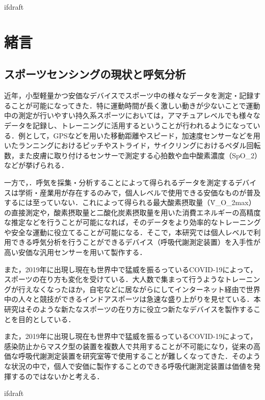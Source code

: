 \expandafter\ifx\csname ifdraft\endcsname\relax
 
\fi

\section{緒言}

\subsection{スポーツセンシングの現状と呼気分析}

近年，小型軽量かつ安価なデバイスでスポーツ中の様々なデータを測定・記録することが可能になってきた．特に運動時間が長く激しい動きが少ないことで運動中の測定が行いやすい持久系スポーツにおいては，アマチュアレベルでも様々なデータを記録し、トレーニングに活用するということが行われるようになっている．例として，GPSなどを用いた移動距離やスピード，加速度センサーなどを用いたランニングにおけるピッチやストライド，サイクリングにおけるペダル回転数，また皮膚に取り付けるセンサーで測定する心拍数や血中酸素濃度（SpO_2）などが挙げられる．

一方で，．呼気を採集・分析することによって得られるデータを測定するデバイスは学術・産業用が存在するのみで，個人レベルで使用できる安価なものが普及するには至っていない．これによって得られる最大酸素摂取量（\.{V}_{O_2max}）の直接測定や，酸素摂取量と二酸化炭素摂取量を用いた消費エネルギーの高精度な推定などを行うことが可能になれば，そのデータをより効率的なトレーニングや安全な運動に役立てることが可能になる．そこで，本研究では個人レベルで利用できる呼気分析を行うことができるデバイス（呼吸代謝測定装置）を入手性が高い安価な汎用センサーを用いて製作する．

また，2019年に出現し現在も世界中で猛威を振るっているCOVID-19によって，スポーツの在り方も変化を受けている．大人数で集まって行うようなトレーニングが行えなくなったほか，自宅などに居ながらにしてインターネット経由で世界中の人々と競技ができるインドアスポーツは急速な盛り上がりを見せている．本研究はそのような新たなスポーツの在り方に役立つ新たなデバイスを製作することを目的としている．

また，2019年に出現し現在も世界中で猛威を振るっているCOVID-19によって，感染防止からマスク型の装置を複数人で共用することが不可能になり，従来の高価な呼吸代謝測定装置を研究室等で使用することが難しくなってきた．そのような状況の中で，個人で安価に製作することのできる呼吸代謝測定装置は価値を発揮するのではないかと考える．

\expandafter\ifx\csname ifdraft\endcsname\relax
  
\fi
